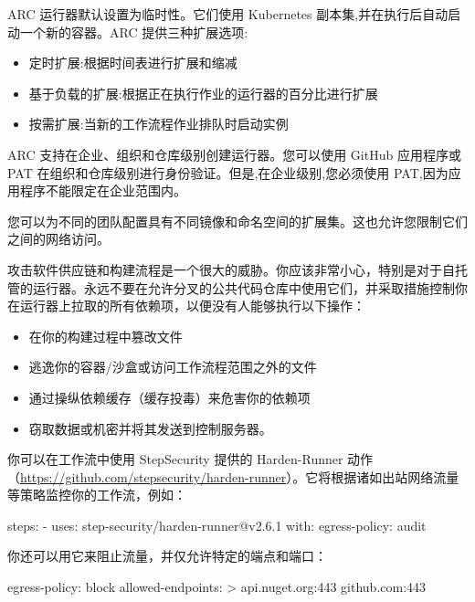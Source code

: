 
ARC 运行器默认设置为临时性。它们使用 Kubernetes 副本集,并在执行后自动启动一个新的容器。ARC 提供三种扩展选项:

\begin{itemize}
\item 
定时扩展:根据时间表进行扩展和缩减

\item 
基于负载的扩展:根据正在执行作业的运行器的百分比进行扩展

\item 
按需扩展:当新的工作流程作业排队时启动实例
\end{itemize}

ARC 支持在企业、组织和仓库级别创建运行器。您可以使用 GitHub 应用程序或 PAT 在组织和仓库级别进行身份验证。但是,在企业级别,您必须使用 PAT,因为应用程序不能限定在企业范围内。

您可以为不同的团队配置具有不同镜像和命名空间的扩展集。这也允许您限制它们之间的网络访问。


攻击软件供应链和构建流程是一个很大的威胁。你应该非常小心，特别是对于自托管的运行器。永远不要在允许分叉的公共代码仓库中使用它们，并采取措施控制你在运行器上拉取的所有依赖项，以便没有人能够执行以下操作：

\begin{itemize}
\item 
在你的构建过程中篡改文件

\item 
逃逸你的容器/沙盒或访问工作流程范围之外的文件

\item 
通过操纵依赖缓存（缓存投毒）来危害你的依赖项 

\item 
窃取数据或机密并将其发送到控制服务器。
\end{itemize}

你可以在工作流中使用 StepSecurity 提供的 Harden-Runner 动作（\url{https://github.com/stepsecurity/harden-runner}）。它将根据诸如出站网络流量等策略监控你的工作流，例如：

\begin{shell}
steps:
  - uses: step-security/harden-runner@v2.6.1
    with:
      egress-policy: audit
\end{shell}

你还可以用它来阻止流量，并仅允许特定的端点和端口：

\begin{shell}
egress-policy: block
allowed-endpoints: >
  api.nuget.org:443
  github.com:443
\end{shell}

